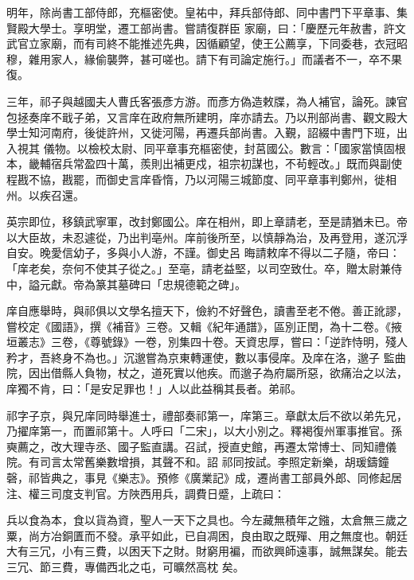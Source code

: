 \begin{pinyinscope}
 明年，除尚書工部侍郎，充樞密使。皇祐中，拜兵部侍郎、同中書門下平章事、集賢殿大學士。享明堂，遷工部尚書。嘗請復群臣
 家廟，曰：「慶歷元年赦書，許文武官立家廟，而有司終不能推述先典，因循顧望，使王公薦享，下同委巷，衣冠昭穆，雜用家人，緣偷襲弊，甚可嗟也。請下有司論定施行。」而議者不一，卒不果復。



 三年，祁子與越國夫人曹氏客張彥方游。而彥方偽造敕牒，為人補官，論死。諫官包拯奏庠不戢子弟，又言庠在政府無所建明，庠亦請去。乃以刑部尚書、觀文殿大學士知河南府，後徙許州，又徙河陽，再遷兵部尚書。入覲，詔綴中書門下班，出入視其
 儀物。以檢校太尉、同平章事充樞密使，封莒國公。數言：「國家當慎固根本，畿輔宿兵常盈四十萬，羨則出補更戍，祖宗初謀也，不茍輕改。」既而與副使程戡不協，戡罷，而御史言庠昏惰，乃以河陽三城節度、同平章事判鄭州，徙相州。以疾召還。



 英宗即位，移鎮武寧軍，改封鄭國公。庠在相州，即上章請老，至是請猶未已。帝以大臣故，未忍遽從，乃出判亳州。庠前後所至，以慎靜為治，及再登用，遂沉浮自安。晚愛信幼子，多與小人游，不謹。御史呂
 晦請敕庠不得以二子隨，帝曰：「庠老矣，奈何不使其子從之。」至亳，請老益堅，以司空致仕。卒，贈太尉兼侍中，謚元獻。帝為篆其墓碑曰「忠規德範之碑」。



 庠自應舉時，與祁俱以文學名擅天下，儉約不好聲色，讀書至老不倦。善正訛謬，嘗校定《國語》，撰《補音》三卷。又輯《紀年通譜》，區別正閏，為十二卷。《掖垣叢志》三卷，《尊號錄》一卷，別集四十卷。天資忠厚，嘗曰：「逆詐恃明，殘人矜才，吾終身不為也。」沉邈嘗為京東轉運使，數以事侵庠。及庠在洛，邈子
 監曲院，因出借縣人負物，杖之，道死實以他疾。而邈子為府屬所惡，欲痛治之以法，庠獨不肯，曰：「是安足罪也！」人以此益稱其長者。弟祁。



 祁字子京，與兄庠同時舉進士，禮部奏祁第一，庠第三。章獻太后不欲以弟先兄，乃擢庠第一，而置祁第十。人呼曰「二宋」，以大小別之。釋褐復州軍事推官。孫奭薦之，改大理寺丞、國子監直講。召試，授直史館，再遷太常博士、同知禮儀院。有司言太常舊樂數增損，其聲不和。詔
 祁同按試。李照定新樂，胡瑗鑄鐘磬，祁皆典之，事見《樂志》。預修《廣業記》成，遷尚書工部員外郎、同修起居注、權三司度支判官。方陜西用兵，調費日蹙，上疏曰：



 兵以食為本，食以貨為資，聖人一天下之具也。今左藏無積年之鏹，太倉無三歲之粟，尚方冶銅匱而不發。承平如此，已自凋困，良由取之既殫、用之無度也。朝廷大有三冗，小有三費，以困天下之財。財窮用褊，而欲興師遠事，誠無謀矣。能去三冗、節三費，專備西北之屯，可曠然高枕
 矣。




\end{pinyinscope}
